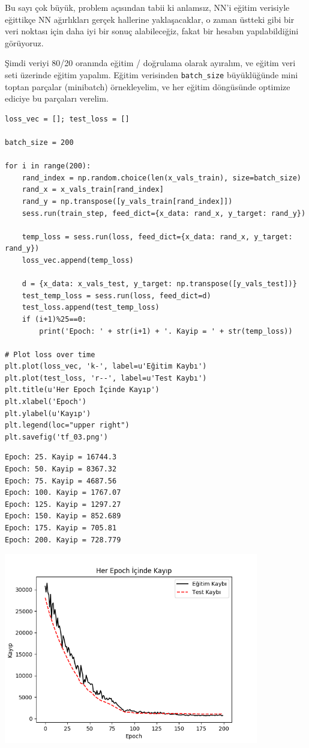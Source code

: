 \documentclass[12pt,fleqn]{article}\usepackage{../../common}
\begin{document}
Bu sayı çok büyük, problem açısından tabii ki anlamsız, NN'i eğitim
verisiyle eğittikçe NN ağırlıkları gerçek hallerine yaklaşacaklar, o zaman
üstteki gibi bir veri noktası için daha iyi bir sonuç alabileceğiz, fakat
bir hesabın yapılabildiğini görüyoruz.

Şimdi veriyi 80/20 oranında eğitim / doğrulama olarak ayıralım, ve eğitim
veri seti üzerinde eğitim yapalım. Eğitim verisinden \verb!batch_size!
büyüklüğünde mini toptan parçalar (minibatch) örnekleyelim, ve her eğitim
döngüsünde optimize ediciye bu parçaları verelim.

\begin{verbatim}
loss_vec = []; test_loss = []

batch_size = 200

for i in range(200):
    rand_index = np.random.choice(len(x_vals_train), size=batch_size)
    rand_x = x_vals_train[rand_index]
    rand_y = np.transpose([y_vals_train[rand_index]])
    sess.run(train_step, feed_dict={x_data: rand_x, y_target: rand_y})

    temp_loss = sess.run(loss, feed_dict={x_data: rand_x, y_target: rand_y})
    loss_vec.append(temp_loss)

    d = {x_data: x_vals_test, y_target: np.transpose([y_vals_test])}
    test_temp_loss = sess.run(loss, feed_dict=d)
    test_loss.append(test_temp_loss)
    if (i+1)%25==0:
        print('Epoch: ' + str(i+1) + '. Kayip = ' + str(temp_loss))

# Plot loss over time
plt.plot(loss_vec, 'k-', label=u'Eğitim Kaybı')
plt.plot(test_loss, 'r--', label=u'Test Kaybı')
plt.title(u'Her Epoch İçinde Kayıp')
plt.xlabel('Epoch')
plt.ylabel(u'Kayıp')
plt.legend(loc="upper right")
plt.savefig('tf_03.png')
\end{verbatim}

\begin{verbatim}
Epoch: 25. Kayip = 16744.3
Epoch: 50. Kayip = 8367.32
Epoch: 75. Kayip = 4687.56
Epoch: 100. Kayip = 1767.07
Epoch: 125. Kayip = 1297.27
Epoch: 150. Kayip = 852.689
Epoch: 175. Kayip = 705.81
Epoch: 200. Kayip = 728.779
\end{verbatim}

\includegraphics[width=30em]{tf_03.png}
\end{document}
